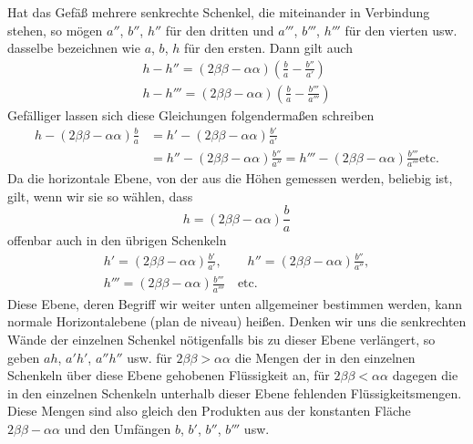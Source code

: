 Hat das Gefäß mehrere senkrechte Schenkel, die miteinander in Verbindung stehen, so mögen $a''$, $b''$, $h''$ für den dritten und $a'''$, $b'''$, $h'''$ für den vierten usw. dasselbe bezeichnen wie $a$, $b$, $h$ für den ersten. Dann gilt auch
\[
\begin{gathered}
h-h''=(2\beta\beta-\alpha\alpha)(\frac{b}{a}-\frac{b''}{a'})\\
h-h'''=(2\beta\beta-\alpha\alpha)(\frac{b}{a}-\frac{b'''}{a'''})
\end{gathered}
\]
Gefälliger lassen sich diese Gleichungen folgendermaßen schreiben
\[
\begin{aligned}
h-(2\beta\beta-\alpha\alpha)\frac{b}{a}&=h'-(2\beta\beta-\alpha\alpha)\frac{b'}{a'}\\
&=h''-(2\beta\beta-\alpha\alpha)\frac{b''}{a''}=h'''-(2\beta\beta-\alpha\alpha)\frac{b'''}{a'''}\text{etc.}
\end{aligned}
\]
Da die horizontale Ebene, von der aus die Höhen gemessen werden, beliebig ist, gilt, wenn wir sie so wählen, dass
\[
h=(2\beta\beta-\alpha\alpha)\frac{b}{a}
\]
offenbar auch in den übrigen Schenkeln
\[
\begin{gathered}
h'=(2\beta\beta-\alpha\alpha)\frac{b'}{a'},\qquad h''=(2\beta\beta-\alpha\alpha)\frac{b''}{a''},\\
h'''=(2\beta\beta-\alpha\alpha)\frac{b'''}{a'''}\quad\text{etc.}
\end{gathered}
\]
Diese Ebene, deren Begriff wir weiter unten allgemeiner bestimmen werden, kann normale Horizontalebene (plan de niveau) heißen. Denken wir uns die senkrechten Wände der einzelnen Schenkel nötigenfalls bis zu dieser Ebene verlängert, so geben $ah$, $a'h'$, $a''h''$ usw. für $2\beta\beta>\alpha\alpha$ die Mengen der in den einzelnen Schenkeln über diese Ebene gehobenen Flüssigkeit an, für $2\beta\beta<\alpha\alpha$ dagegen die in den einzelnen Schenkeln unterhalb dieser Ebene fehlenden Flüssigkeitsmengen. Diese Mengen sind also gleich den Produkten aus der konstanten Fläche $2\beta\beta-\alpha\alpha$ und den Umfängen $b$, $b'$, $b''$, $b'''$ usw.

